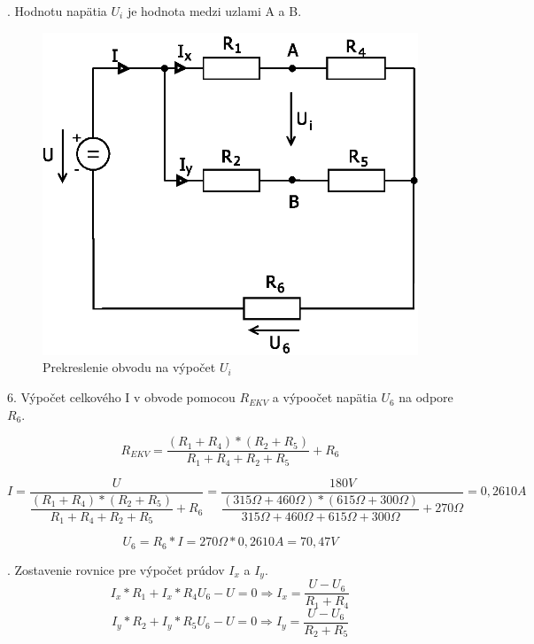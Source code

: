 \documentclass[a4paper,12pt]{article}
\begin{document}
. Hodnotu napätia $U_i$ je hodnota medzi uzlami A a B.
\begin{figure}[!htb]
\centering
\includegraphics[scale=1.2]{p2/p5.eps}
\caption{Prekreslenie obvodu na výpočet $U_i$}
\end{figure}

6. Výpočet celkového I v obvode pomocou $R_{EKV}$ a výpoočet napätia $U_6$ na odpore $R_6$.

\begin{equation}
R_{EKV} = \frac{(R_1 + R_4) * (R_2 + R_5)}{R_1 + R_4 + R_2 + R_5} + R_6
\end{equation}

\begin{equation}
I = \frac{U}{\dfrac{(R_1 + R_4) * (R_2 + R_5)}{R_1 + R_4 + R_2 + R_5} + R_6} =
\frac{180V}{\dfrac{(315\Omega + 460\Omega) * (615\Omega + 300\Omega)}{315\Omega + 460\Omega + 615\Omega + 300\Omega} +270\Omega} = 0,2610A
\end{equation}

\begin{equation}
U_6 = R_6 * I = 270\Omega * 0,2610A = 70,47V
\end{equation}

. Zostavenie rovnice pre výpočet prúdov $I_x$ a $I_y$.
\begin{equation}
I_x * R_1 + I_x * R_4 U_6 - U = 0 \Rightarrow I_x = \frac{U - U_6}{R_1 + R_4}
\end{equation}
\begin{equation}
I_y * R_2 + I_y * R_5 U_6 - U = 0 \Rightarrow I_y = \frac{U - U_6}{R_2 + R_5}
\end{equation}
\end{document}
